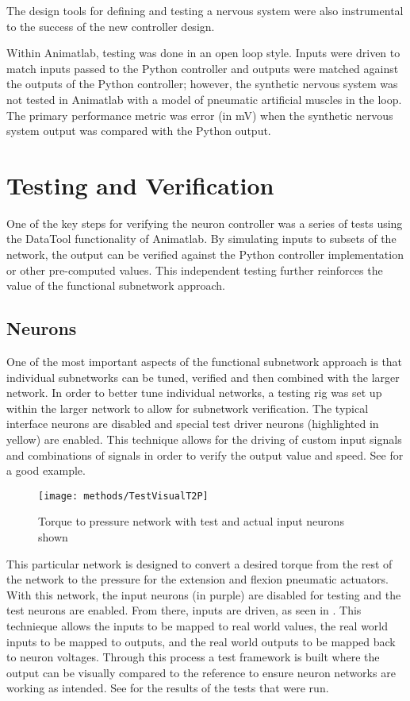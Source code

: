 The design tools for defining and testing a nervous system were also instrumental
to the success of the new controller design.

Within Animatlab, testing was done in an open loop style. Inputs were driven to match inputs passed to the Python controller and outputs were matched against the outputs of the Python controller; however, the synthetic nervous system was not tested in Animatlab with a model of pneumatic artificial muscles in the loop. The primary performance metric was error (in mV) when the synthetic nervous system output was compared with the Python output.

\section{Testing and Verification}

One of the key steps for verifying the neuron controller was a series of tests
using the DataTool functionality of Animatlab. By simulating inputs to subsets
of the network, the output can be verified against the Python controller
implementation or other pre-computed values. This independent testing further
reinforces the value of the functional subnetwork approach.

\subsection{Neurons}

One of the most important aspects of the functional subnetwork approach is that
individual subnetworks can be tuned, verified and then combined with the larger
network. In order to better tune individual networks, a testing rig was set up
within the larger network to allow for subnetwork verification. The typical
interface neurons are disabled and special test driver neurons (highlighted in
yellow) are enabled. This technique allows for the driving of custom input signals and
combinations of signals in order to verify the output value and speed. 
See  for a good example.

\begin{figure}
\centering
\texttt{[image: methods/TestVisualT2P]}
\caption{Torque to pressure network with test and actual input neurons shown}
\label{fig:TestNetworkT2P}
\end{figure}

This particular network is designed to convert a desired torque from the rest
of the network to the pressure for the extension and flexion pneumatic actuators.
With this network, the input neurons (in purple)
are disabled for testing and the test neurons are enabled. From there, inputs
are driven, as seen in . This technieque allows the inputs to 
be mapped to real world values, the real world inputs to be mapped to outputs, 
and the real world outputs to be mapped back to neuron voltages. Through this
process a test framework is built where the output can be visually compared to the 
reference to ensure neuron networks are working as intended. See 
 for the results of the tests that were run.

